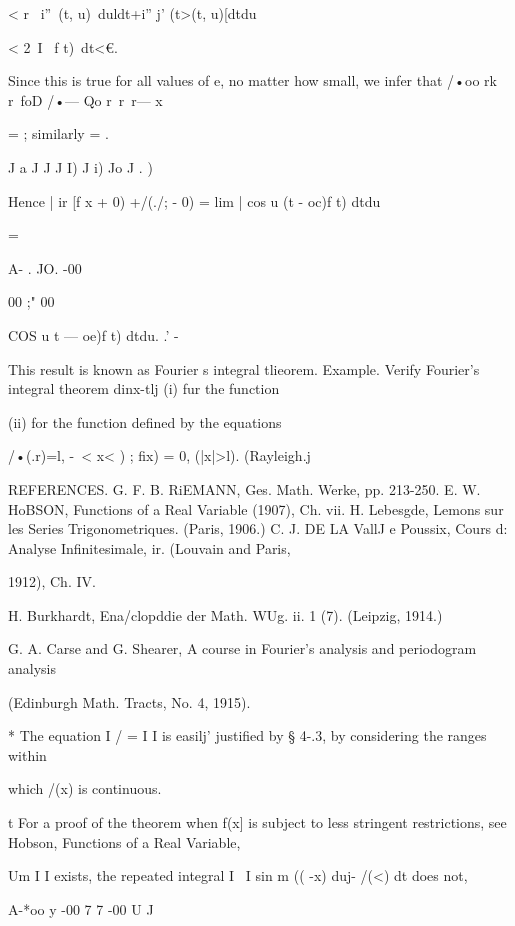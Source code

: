 {< r \ i''\ < t>(t, u)\ duldt+i'' j'  (t>(t, u)[dtdu 

< 2\ I  \ f t)\ dt<€. 

Since this is true for all values of e, no matter how small, we infer that 
/•oo rk r\ foD /•— Qo r\ r\ r— x 

= ; similarly = . 

J a J J J I) J i) Jo J .  ) 

Hence | ir [f x + 0) +/(./; - 0)  = lim | cos u (t - oc)f t) dtdu 



=   



A- .  JO. -00 

00 ;" 00 



COS u  t — oe)f t) dtdu. 
.' -  



This result is known as Fourier s integral tlieorem.  
Example. Verify Fourier's integral theorem dinx-tlj (i) fur the function 

(ii) for the function defined by the equations 

/•(.r)=l,  -\ < x< ) ; fix) = 0, (|x|>l). (Rayleigh.j 

REFERENCES. 
G. F. B. RiEMANN, Ges. Math. Werke, pp. 213-250. 
E. W. HoBSON, Functions of a Real Variable (1907), Ch. vii. 
H. Lebesgde, Lemons sur les Series Trigonometriques. (Paris, 1906.) 
C. J. DE LA VallJ e Poussix, Cours d: Analyse Infinitesimale, ir. (Louvain and Paris, 

1912), Ch. IV. 

H. Burkhardt, Ena/clopddie der Math. WUg. ii. 1 (7). (Leipzig, 1914.) 

G. A. Carse and G. Shearer, A course in Fourier's analysis and periodogram analysis 

(Edinburgh Math. Tracts, No. 4, 1915). 

* The equation I / = I I is easilj' justified by § 4-.3, by considering the ranges within 

which /(x) is continuous. 

t For a proof of the theorem when f(x] is subject to less stringent restrictions, see 
Hobson, Functions of a Real Variable, %

Um I I exists, the repeated integral I \ I sin m (( -x) duj- /(<) dt does not, 

A-*oo y -00 7 7 -00 U J 



}
